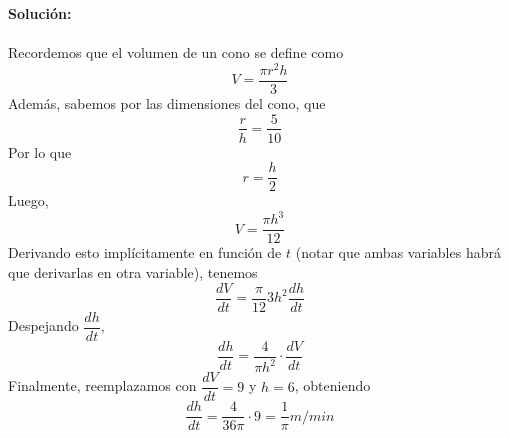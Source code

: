 \documentclass[12pt]{article}
\newenvironment{solucion}
{\begin{mdframed}[backgroundcolor=black!10]
		{\bf Solución:}\\
	}
	{
	\end{mdframed}
}
\newenvironment{preguntas}
{\begin{enumerate}\itemsep12pt
	}
	{
	\end{enumerate}
}
\begin{document}
\begin{preguntas}
\begin{solucion}
\\
Recordemos que el volumen de un cono se define como
$$V = \dfrac{\pi r^2 h}{3}$$
Además, sabemos por las dimensiones del cono, que
$$\dfrac{r}{h} = \dfrac{5}{10}$$
Por lo que 
$$r = \dfrac{h}{2}$$
Luego,
$$V = \dfrac{\pi h^3}{12}$$
Derivando esto implícitamente en función de $t$ (notar que ambas variables habrá que derivarlas en otra variable), tenemos
$$\dfrac{dV}{dt} = \dfrac{\pi}{12}3h^2\dfrac{dh}{dt}$$
Despejando $\dfrac{dh}{dt}$,
$$\dfrac{dh}{dt} = \dfrac{4}{\pi h^2} \cdot \dfrac{dV}{dt}$$
Finalmente, reemplazamos con $\dfrac{dV}{dt} = 9$ y $h = 6$, obteniendo
$$\dfrac{dh}{dt} = \dfrac{4}{36\pi}\cdot 9 = \dfrac{1}{\pi} m/min$$
\end{solucion}
\end{preguntas}
\end{document}

